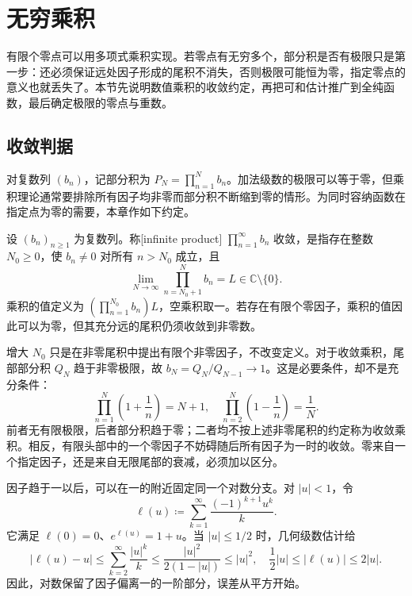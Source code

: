 \section{无穷乘积}
\label{b3:sec:2001}

有限个零点可以用多项式乘积实现。若零点有无穷多个，部分积是否有极限只是第一步：还必须保证远处因子形成的尾积不消失，否则极限可能恒为零，指定零点的意义也就丢失了。本节先说明数值乘积的收敛约定，再把可和估计推广到全纯函数，最后确定极限的零点与重数。

\subsection{收敛判据}
\label{b3:subsec:200101}

对复数列 \((b_n)\)，记部分积为 \(P_N=\prod_{n=1}^N b_n\)。加法级数的极限可以等于零，但乘积理论通常要排除所有因子均非零而部分积不断缩到零的情形。为同时容纳函数在指定点为零的需要，本章作如下约定。

\begin{definition}\label{b3:def:20-infinite-product}
设 \((b_n)_{n\ge1}\) 为复数列。称[infinite product] \(\prod_{n=1}^{\infty}b_n\) 收敛，是指存在整数 \(N_0\ge0\)，使 \(b_n\ne0\) 对所有 \(n>N_0\) 成立，且
\[
 \lim_{N\to\infty}\prod_{n=N_0+1}^{N}b_n=L\in\mathbb C\setminus\{0\}.
\]
乘积的值定义为 \((\prod_{n=1}^{N_0}b_n)L\)，空乘积取一。若存在有限个零因子，乘积的值因此可以为零，但其充分远的尾积仍须收敛到非零数。
\end{definition}
增大 \(N_0\) 只是在非零尾积中提出有限个非零因子，不改变定义。对于收敛乘积，尾部部分积 \(Q_N\) 趋于非零极限，故 \(b_N=Q_N/Q_{N-1}\to1\)。这是必要条件，却不是充分条件：
\[
 \prod_{n=1}^{N}\left(1+\frac1n\right)=N+1,
 \quad
 \prod_{n=2}^{N}\left(1-\frac1n\right)=\frac1N.
\]
前者无有限极限，后者部分积趋于零；二者均不按上述非零尾积的约定称为收敛乘积。相反，有限头部中的一个零因子不妨碍随后所有因子为一时的收敛。零来自一个指定因子，还是来自无限尾部的衰减，必须加以区分。

\ProseParagraphBreak

因子趋于一以后，可以在一的附近固定同一个对数分支。对 \(|u|<1\)，令
\[
 \ell(u)\coloneqq\sum_{k=1}^{\infty}\frac{(-1)^{k+1}u^k}{k}.
\]
它满足 \(\ell(0)=0\)、\(e^{\ell(u)}=1+u\)。当 \(|u|\le1/2\) 时，几何级数估计给
\[
 |\ell(u)-u|
 \le\sum_{k=2}^{\infty}\frac{|u|^k}{k}
 \le\frac{|u|^2}{2(1-|u|)}\le|u|^2,
 \quad
 \frac12|u|\le|\ell(u)|\le2|u|.
\]
因此，对数保留了因子偏离一的一阶部分，误差从平方开始。

